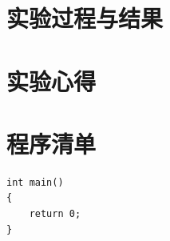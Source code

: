 \documentclass[12pt,UTF8]{ctexart}
\begin{document}
\section{实验过程与结果}

\section{实验心得}

\section{程序清单}
\begin{lstlisting}
int main()
{
	return 0;
}
\end{lstlisting}
\end{document}
